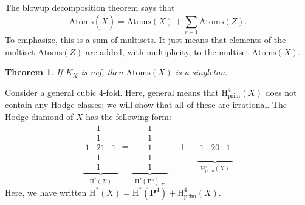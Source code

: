 \documentclass[11pt, reqno]{amsart}
\numberwithin{equation}{section}
\theoremstyle{plain}
\newtheorem{theorem}{Theorem}[section]
\theoremstyle{definition}
\theoremstyle{italicsname}
\newcommand{\prim}{\mathrm{prim}}
\newcommand{\Atoms}{\mathrm{Atoms}}
\newcommand{\rH}{\mathrm{H}}
\newcommand{\bP}{\mathbf{P}}
\begin{document}
The blowup decomposition theorem says that
\begin{equation}
\label{blowup_atoms}
    \Atoms(\tilde X) = \Atoms(X) + \sum_{r - 1} \Atoms(Z).
\end{equation}
To emphasize, this is a sum of multisets. It just means that elements of the multiset $\Atoms(Z)$ are added, with multiplicity, to the multiset $\Atoms(X)$.

\begin{theorem}
\label{thm:main_theorem}
    If $K_X$ is nef, then $\Atoms(X)$ is a singleton. 
\end{theorem}

Consider a general cubic $4$-fold. 
Here, general means that $\rH^4_{\prim}(X)$ does not contain any Hodge classes; we will show that all of these are irrational.
The Hodge diamond of $X$ has the following form:
\[
    \underbrace{\begin{array}{ccc}
        & 1 \\
        & 1 \\
        1 & 21 & 1 \\
        & 1 \\
        & 1 
    \end{array}}_{\rH^*(X)} =
    \underbrace{\begin{array}{ccccc}
       & & 1 \\
       & & 1 \\
       & & 1 & & \\
       & & 1 \\
       & & 1 
    \end{array}}_{\rH^*(\bP^5)|_{X}} \quad + \quad \underbrace{\begin{array}{ccc}
        \\
        \\
        1 & 20 & 1 \\
        \\
        &
    \end{array}}_{\rH^4_{\prim}(X)}
\]
Here, we have written $\rH^*(X) = \rH^*(\bP^4) + \rH^4_{\prim}(X)$. 
\end{document}
